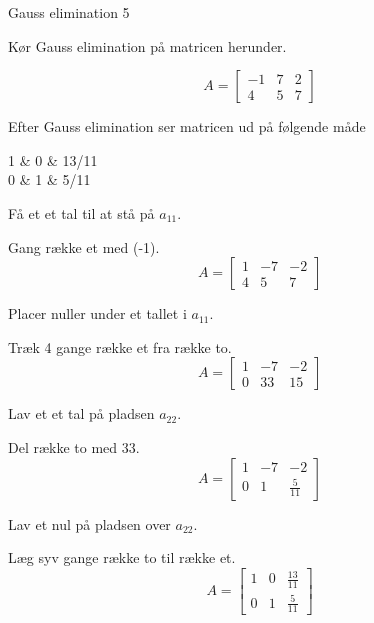 \documentclass{article}
\begin{document}
\begin{exercise}{Gauss elimination 5}
	
	
	Kør Gauss elimination på matricen herunder.
	
	\[
	A = \left[\begin{array}{rr|r}
	-1 & 7 & 2 \\ 
	4 & 5 & 7
	\end{array} \right]
	\]
	
	Efter Gauss elimination ser matricen ud på følgende måde
	\begin{answermatrix}
		1 & 0 & 13/11 \\
		0 & 1 & 5/11
	\end{answermatrix}
	
	\hint
	Få et et tal til at stå på $a_{11}$.
	
	\hint
	Gang række et med (-1).
	\[
	A = \left[\begin{array}{rr|r}
	1 & -7 & -2 \\ 
	4 & 5 & 7
	\end{array} \right]
	\]
	
	\hint
	Placer nuller under et tallet i $a_{11}$.
	
	\hint
	Træk 4 gange række et fra række to.
	\[
	A = \left[\begin{array}{rr|r}
	1 & -7 & -2 \\ 
	0 & 33 & 15
	\end{array} \right]
	\]
	
	\hint
	Lav et et tal på pladsen $a_{22}$.
	
	\hint
	Del række to med $33$.
	\[
	A = \left[\begin{array}{rr|r}
	1 & -7 & -2 \\ 
	0 & 1 & \frac{5}{11}
	\end{array} \right]
	\]
	
	
	\hint
	Lav et nul på pladsen over $a_{22}$.
	
	\hint
	Læg syv gange række to til række et.
	\[
	A = \left[\begin{array}{rr|r}
	1 & 0 & \frac{13}{11} \\ 
	0 & 1 & \frac{5}{11}
	\end{array} \right]
	\]
	
	
\end{exercise}

\newpage
\end{document}
